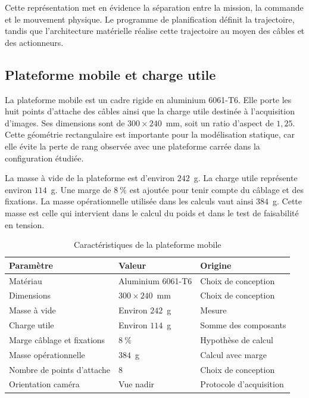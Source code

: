 Cette représentation met en évidence la séparation entre la mission, la commande et le mouvement physique. Le programme de planification définit la trajectoire, tandis que l'architecture matérielle réalise cette trajectoire au moyen des câbles et des actionneurs.

\subsection{Plateforme mobile et charge utile}

La plateforme mobile est un cadre rigide en aluminium 6061-T6. Elle porte les huit points d'attache des câbles ainsi que la charge utile destinée à l'acquisition d'images. Ses dimensions sont de $300\times240$~mm, soit un ratio d'aspect de $1{,}25$. Cette géométrie rectangulaire est importante pour la modélisation statique, car elle évite la perte de rang observée avec une plateforme carrée dans la configuration étudiée.

La masse à vide de la plateforme est d'environ $242$~g. La charge utile représente environ $114$~g. Une marge de $8~\%$ est ajoutée pour tenir compte du câblage et des fixations. La masse opérationnelle utilisée dans les calculs vaut ainsi $384$~g. Cette masse est celle qui intervient dans le calcul du poids et dans le test de faisabilité en tension.

\begin{table}[H]
\centering
\caption{Caractéristiques de la plateforme mobile}
\label{tab:plateforme_nouvelle}
\begin{tabular}{|p{5.0cm}|p{4.0cm}|p{4.0cm}|}
\hline
\textbf{Paramètre} & \textbf{Valeur} & \textbf{Origine} \\
\hline
Matériau & Aluminium 6061-T6 & Choix de conception \\
\hline
Dimensions & $300\times240$~mm & Choix de conception \\
\hline
Masse à vide & Environ $242$~g & Mesure \\
\hline
Charge utile & Environ $114$~g & Somme des composants \\
\hline
Marge câblage et fixations & $8~\%$ & Hypothèse de calcul \\
\hline
Masse opérationnelle & $384$~g & Calcul avec marge \\
\hline
Nombre de points d'attache & $8$ & Choix de conception \\
\hline
Orientation caméra & Vue nadir & Protocole d'acquisition \\
\hline
\end{tabular}
\end{table}

